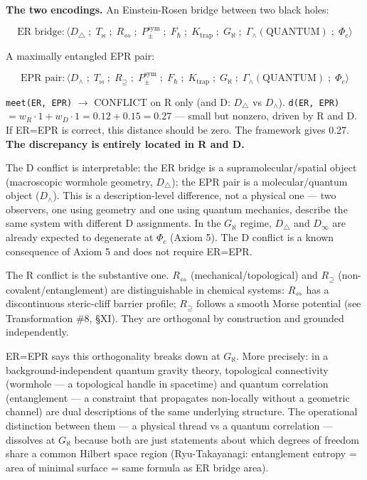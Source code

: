 \documentclass[12pt,a4paper]{article}
\begin{document}
\textbf{The two encodings.} An Einstein-Rosen bridge between two black holes:

\[\text{ER bridge}: \langle D_{\triangle} \;;\; T_{\bowtie} \;;\; R_{\Leftrightarrow} \;;\; P_{\pm}^{\text{sym}} \;;\; F_{\hbar} \;;\; K_{\text{trap}} \;;\; G_{\aleph} \;;\; \Gamma_{\wedge}(\text{QUANTUM}) \;;\; \Phi_{c} \rangle\]

A maximally entangled EPR pair:

\[\text{EPR pair}: \langle D_{\wedge} \;;\; T_{\bowtie} \;;\; R_{\supseteq} \;;\; P_{\pm}^{\text{sym}} \;;\; F_{\hbar} \;;\; K_{\text{trap}} \;;\; G_{\aleph} \;;\; \Gamma_{\wedge}(\text{QUANTUM}) \;;\; \Phi_{c} \rangle\]

\texttt{meet(ER, EPR)} $\to$ CONFLICT on R only (and D: $D_{\triangle}$ vs $D_{\wedge}$). \texttt{d(ER, EPR)} $= w_R \cdot 1 + w_D \cdot 1 = 0.12 + 0.15 = 0.27$ --- small but nonzero, driven by R and D. If ER=EPR is correct, this distance should be zero. The framework gives 0.27. \textbf{The discrepancy is entirely located in R and D.}

The D conflict is interpretable: the ER bridge is a supramolecular/spatial object (macroscopic wormhole geometry, $D_{\triangle}$); the EPR pair is a molecular/quantum object ($D_{\wedge}$). This is a description-level difference, not a physical one --- two observers, one using geometry and one using quantum mechanics, describe the same system with different D assignments. In the $G_{\aleph}$ regime, $D_{\triangle}$ and $D_{\infty}$ are already expected to degenerate at $\Phi_c$ (Axiom 5). The D conflict is a known consequence of Axiom 5 and does not require ER=EPR.

The R conflict is the substantive one. $R_{\Leftrightarrow}$ (mechanical/topological) and $R_{\supseteq}$ (non-covalent/entanglement) are distinguishable in chemical systems: $R_{\Leftrightarrow}$ has a discontinuous steric-cliff barrier profile; $R_{\supseteq}$ follows a smooth Morse potential (see Transformation \#8, §XI). They are orthogonal by construction and grounded independently.

ER=EPR says this orthogonality breaks down at $G_{\aleph}$. More precisely: in a background-independent quantum gravity theory, topological connectivity (wormhole --- a topological handle in spacetime) and quantum correlation (entanglement --- a constraint that propagates non-locally without a geometric channel) are dual descriptions of the same underlying structure. The operational distinction between them --- a physical thread vs a quantum correlation --- dissolves at $G_{\aleph}$ because both are just statements about which degrees of freedom share a common Hilbert space region (Ryu-Takayanagi: entanglement entropy = area of minimal surface = same formula as ER bridge area).
\end{document}
